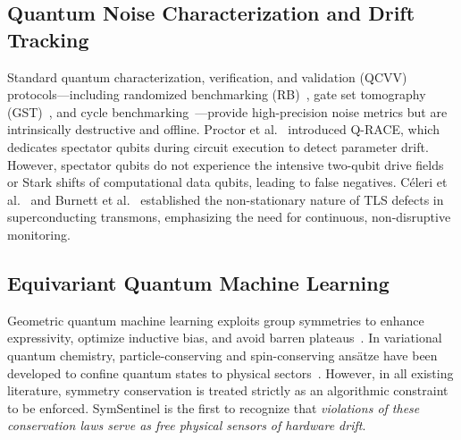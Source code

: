 \documentclass[aps,pra,twocolumn,superscriptaddress,10pt,floatfix]{revtex4-2}
\begin{document}
\subsection{Quantum Noise Characterization and Drift Tracking}
Standard quantum characterization, verification, and validation (QCVV) protocols—including randomized benchmarking (RB)~\cite{magesan2012efficient}, gate set tomography (GST)~\cite{nielsen2021gate}, and cycle benchmarking~\cite{erhard2019characterizing}—provide high-precision noise metrics but are intrinsically destructive and offline. Proctor et al.~\cite{proctor2020detecting} introduced Q-RACE, which dedicates spectator qubits during circuit execution to detect parameter drift. However, spectator qubits do not experience the intensive two-qubit drive fields or Stark shifts of computational data qubits, leading to false negatives. C\'eleri et al.~\cite{klimov2018fluctuations} and Burnett et al.~\cite{burnett2019decoherence} established the non-stationary nature of TLS defects in superconducting transmons, emphasizing the need for continuous, non-disruptive monitoring.

\subsection{Equivariant Quantum Machine Learning}
Geometric quantum machine learning exploits group symmetries to enhance expressivity, optimize inductive bias, and avoid barren plateaus~\cite{schatzki2024theoretical,ragone2024representation,meyer2023exploiting,nguyen2024theory}. In variational quantum chemistry, particle-conserving and spin-conserving ans\"atze have been developed to confine quantum states to physical sectors~\cite{bonet2018low,mcardle2019error,cai2023quantum}. However, in all existing literature, symmetry conservation is treated strictly as an algorithmic constraint to be enforced. SymSentinel is the first to recognize that \textit{violations of these conservation laws serve as free physical sensors of hardware drift}.
\end{document}
